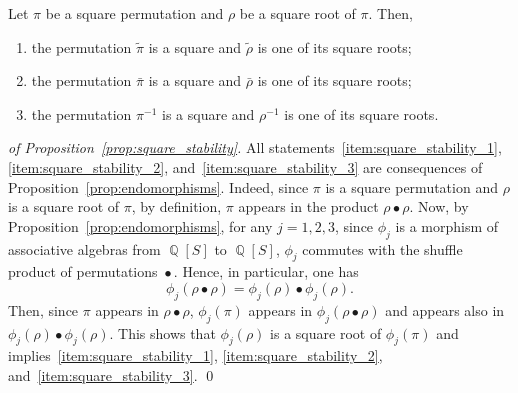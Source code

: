 \documentclass[a4paper]{llncs}
\DeclareMathOperator{\QQ}{\mathbb{Q}}
\DeclareMathOperator{\SHUFFLE}{\bullet}
\begin{document}
\begin{proposition} \label{prop:square_stability}
    Let $\pi$ be a square permutation and $\rho$ be a square root of
    $\pi$. Then,
    \begin{enumerate}[label={\it (\roman*)},fullwidth]
        \item \label{item:square_stability_1}
        the permutation $\widetilde{\pi}$ is a square and
        $\widetilde{\rho}$ is one of its square roots;
        \item \label{item:square_stability_2}
        the permutation $\bar \pi$ is a square and $\bar \rho$ is one of
        its square roots;
        \item \label{item:square_stability_3}
        the permutation $\pi^{-1}$ is a square and $\rho^{-1}$ is one of
        its square roots.
    \end{enumerate}
\end{proposition}
\begin{proof}[of Proposition~\ref{prop:square_stability}]
    All statements~\ref{item:square_stability_1},
    \ref{item:square_stability_2}, and~\ref{item:square_stability_3} are
    consequences of Proposition~\ref{prop:endomorphisms}. Indeed,
    since $\pi$ is a square permutation and $\rho$ is a square root of
    $\pi$, by definition, $\pi$ appears in the product
    $\rho \SHUFFLE \rho$. Now, by Proposition~\ref{prop:endomorphisms},
    for any $j = 1, 2, 3$, since $\phi_j$ is a morphism of associative
    algebras from $\QQ[S]$ to $\QQ[S]$, $\phi_j$ commutes with the
    shuffle product of permutations $\SHUFFLE$. Hence, in particular,
    one has
    \begin{equation}
        \phi_j(\rho \SHUFFLE \rho) =
        \phi_j(\rho) \SHUFFLE \phi_j(\rho).
    \end{equation}
    Then, since $\pi$ appears in $\rho \SHUFFLE \rho$, $\phi_j(\pi)$
    appears in $\phi_j(\rho \SHUFFLE \rho)$ and appears also in
    $\phi_j(\rho) \SHUFFLE \phi_j(\rho)$. This shows that
    $\phi_j(\rho)$ is a square root of $\phi_j(\pi)$ and
    implies~\ref{item:square_stability_1}, \ref{item:square_stability_2},
    and~\ref{item:square_stability_3}.
    \qed
\end{proof}
\medskip
\end{document}
